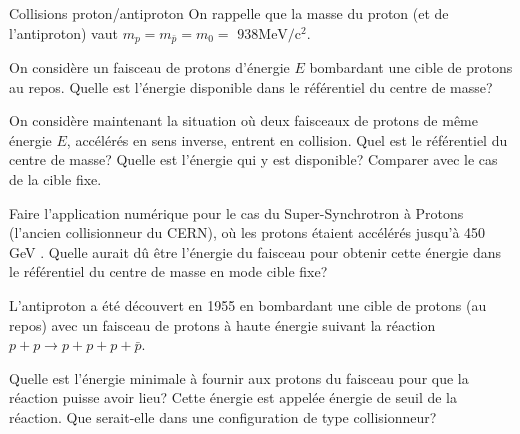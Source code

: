 \begin{exo}[PC][1][colle]{Collisions proton/antiproton}
On rappelle que la masse du proton (et de l'antiproton) vaut $m_p=m_{\bar{p}}=m_0=$ $938 \mathrm{MeV} / \mathrm{c}^2$.
\begin{quest}
  \item On considère un faisceau de protons d'énergie $E$ bombardant une cible de protons au repos. Quelle est l'énergie disponible dans le référentiel du centre de masse?
  \item On considère maintenant la situation où deux faisceaux de protons de même énergie $E$, accélérés en sens inverse, entrent en collision. Quel est le référentiel du centre de masse? Quelle est l'énergie qui y est disponible? Comparer avec le cas de la cible fixe.
  \item Faire l'application numérique pour le cas du Super-Synchrotron à Protons (l'ancien collisionneur du CERN), où les protons étaient accélérés jusqu'à 450 GeV . Quelle aurait dû être l'énergie du faisceau pour obtenir cette énergie dans le référentiel du centre de masse en mode cible fixe?
  \item L'antiproton a été découvert en 1955 en bombardant une cible de protons (au repos) avec un faisceau de protons à haute énergie suivant la réaction $p+p \rightarrow p+p+p+\bar{p}$.
  
  Quelle est l'énergie minimale à fournir aux protons du faisceau pour que la réaction puisse avoir lieu? Cette énergie est appelée énergie de seuil de la réaction. Que serait-elle dans une configuration de type collisionneur?
\end{quest}
\end{exo}


